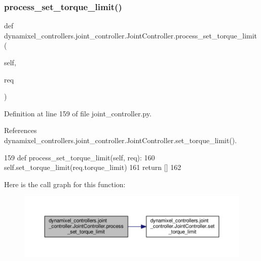 \subsubsection{\texorpdfstring{process\+\_\+set\+\_\+torque\+\_\+limit()}{process\_set\_torque\_limit()}}
{\footnotesize\ttfamily def dynamixel\+\_\+controllers.\+joint\+\_\+controller.\+Joint\+Controller.\+process\+\_\+set\+\_\+torque\+\_\+limit (\begin{DoxyParamCaption}\item[{}]{self,  }\item[{}]{req }\end{DoxyParamCaption})\hspace{0.3cm}{\ttfamily [inherited]}}



Definition at line 159 of file joint\+\_\+controller.\+py.



References dynamixel\+\_\+controllers.\+joint\+\_\+controller.\+Joint\+Controller.\+set\+\_\+torque\+\_\+limit().


\begin{DoxyCode}
159     \textcolor{keyword}{def }process\_set\_torque\_limit(self, req):
160         self.set\_torque\_limit(req.torque\_limit)
161         \textcolor{keywordflow}{return} []
162 
\end{DoxyCode}
Here is the call graph for this function\+:
\nopagebreak
\begin{figure}[H]
\begin{center}
\leavevmode
\includegraphics[width=350pt]{d3/dcd/classdynamixel__controllers_1_1joint__controller_1_1_joint_controller_aa199ce6ae353ed44fe71ae96a5da242d_cgraph}
\end{center}
\end{figure}
\mbox{\label{classdynamixel__controllers_1_1joint__controller_1_1_joint_controller_a2181fcf467234ed09e378a93ea5a0553}} 
